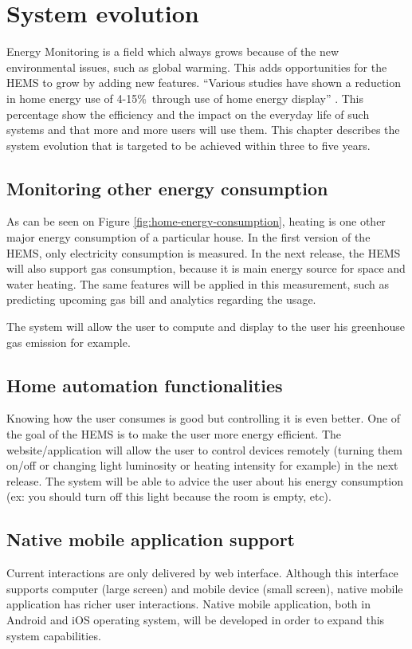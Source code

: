 \chapter{System evolution}
\label{ch:evolution}
Energy Monitoring is a field which always grows because of the new environmental issues, such as global warming. This adds opportunities for the HEMS to grow by adding new features. ``Various studies have shown a reduction in home energy use of 4-15\%\ through use of home energy display'' \cite{energymonitor}. This percentage show the efficiency and the impact on the everyday life of such systems and that more and more users will use them. This chapter describes the system evolution that is targeted to be achieved within three to five years.

\section{Monitoring other energy consumption}
As can be seen on Figure \ref{fig:home-energy-consumption}, heating is one other major energy consumption of a particular house. In the first version of the HEMS, only electricity consumption is measured. In the next release, the HEMS will also support gas consumption, because it is main energy source for space and water heating. The same features will be applied in this measurement, such as predicting upcoming gas bill and analytics regarding the usage.

The system will allow the user to compute and display to the user his greenhouse gas emission for example.

\section{Home automation functionalities}
Knowing how the user consumes is good but controlling it is even better. One of the goal of the HEMS is to make the user more energy efficient. The website/application will allow the user to control devices remotely (turning them on/off or changing light luminosity or heating intensity for example) in the next release. The system will be able to advice the user about his energy consumption (ex: you should turn off this light because the room is empty, etc).

\section{Native mobile application support}
Current interactions are only delivered by web interface. Although this interface supports computer (large screen) and mobile device (small screen), native mobile application has richer user interactions. Native mobile application, both in Android and iOS operating system, will be developed in order to expand this system capabilities. 

